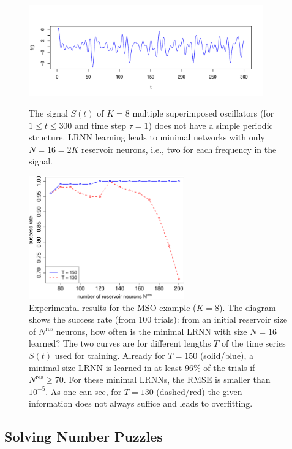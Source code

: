 \documentclass[twoside,11pt]{article}
\theoremstyle{definition}
\begin{document}
\begin{figure}
  \centering
  \includegraphics[width=0.9\textwidth]{fig/signal2}
  \caption{The signal $S(t)$ of $K=8$ multiple superimposed oscillators (for $1 \le t
	\le 300$ and time step $\tau=1$) does not have a simple periodic structure. LRNN learning leads
	to minimal networks with only $N=16=2K$ reservoir neurons, i.e., two for
	each frequency in the signal.}
  \label{signal}
\bigskip
  \includegraphics[width=0.6\textwidth]{fig/mso8}%
  \caption{Experimental results for the MSO example ($K=8$). The diagram shows the
	success rate (from 100 trials): from an initial reservoir size of $N^\mathrm{res}$
	neurons, how often is the minimal LRNN with size
	$N=16$ learned? The two curves are for different lengths $T$ of the time series
	$S(t)$ used for training. Already for $T=150$ (solid/blue), a
	minimal-size LRNN is learned in at least 96\% of the trials if
	$N^\mathrm{res} \ge 70$. For these minimal LRNNs, the RMSE is smaller
	than $10^{-5}$. As one can see, for $T=130$ (dashed/red) the given
	information does not always suffice and leads to overfitting.}
  \label{mso8}
\end{figure}

\subsection{Solving Number Puzzles}
\end{document}
